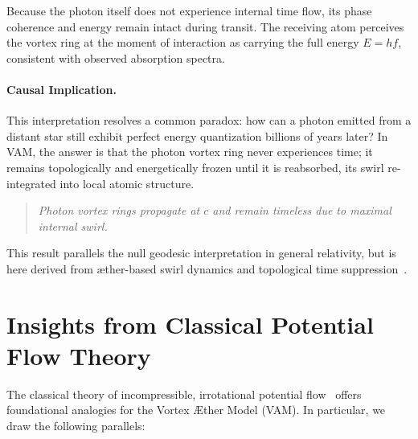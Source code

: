         Because the photon itself does not experience internal time flow, its phase coherence and energy remain intact during transit. The receiving atom perceives the vortex ring at the moment of interaction as carrying the full energy $E = h f$, consistent with observed absorption spectra.

        \paragraph{Causal Implication.}
        This interpretation resolves a common paradox: how can a photon emitted from a distant star still exhibit perfect energy quantization billions of years later? In VAM, the answer is that the photon vortex ring never experiences time; it remains topologically and energetically frozen until it is reabsorbed, its swirl re-integrated into local atomic structure.

        \begin{quote}
            \emph{Photon vortex rings propagate at  $c$  and remain timeless due to maximal internal swirl.}
        \end{quote}

        This result parallels the null geodesic interpretation in general relativity, but is here derived from æther-based swirl dynamics and topological time suppression~\cite{VAM-1, battye1998}.

\section{Insights from Classical Potential Flow Theory}
        The classical theory of incompressible, irrotational potential flow~\cite{caughey2008} offers foundational analogies for the Vortex \AE ther Model (VAM). In particular, we draw the following parallels:

